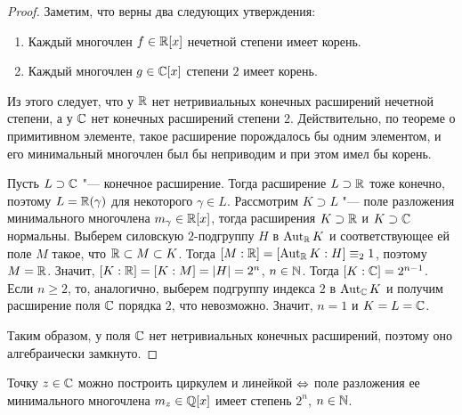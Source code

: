 \begin{proof}
	Заметим, что верны два следующих утверждения:
	\begin{enumerate}
		\item Каждый многочлен $f \in \mathbb{R}[x]$ нечетной степени имеет корень.
		\item Каждый многочлен $g \in \mathbb{C}[x]$ степени $2$ имеет корень.
	\end{enumerate}

	Из этого следует, что у $\mathbb{R}$ нет нетривиальных конечных расширений нечетной степени, а у $\mathbb{C}$ нет конечных расширений степени $2$. Действительно, по теореме о примитивном элементе, такое расширение порождалось бы одним элементом, и его минимальный многочлен был бы неприводим и при этом имел бы корень.
	
	Пусть $L \supset \mathbb{C}$ "--- конечное расширение. Тогда расширение $L \supset \mathbb{R}$ тоже конечно, поэтому $L = \mathbb{R}(\gamma)$ для некоторого $\gamma \in L$. Рассмотрим $K \supset L$ "--- поле разложения минимального многочлена $m_\gamma \in \mathbb{R}[x]$, тогда расширения $K \supset\mathbb{R}$ и $K \supset \mathbb{C}$ нормальны. Выберем силовскую $2$-подгруппу $H$ в $\operatorname{Aut}_{\mathbb{R}}K$ и соответствующее ей поле $M$ такое, что $\mathbb{R} \subset M \subset K$. Тогда $[M : \R] \hm= [\Aut_{\R}K : H] \equiv_2 1$, поэтому $M = \mathbb{R}$. Значит, $[K : \mathbb{R}] = [K : M] = |H| = 2^n$, $n \in \mathbb{N}$. Тогда $[K : \mathbb{C}] = 2^{n - 1}$. Если $n \ge 2$, то, аналогично, выберем подгруппу индекса $2$ в $\operatorname{Aut}_{\mathbb{C}}K$ и получим расширение поля $\mathbb{C}$ порядка $2$, что невозможно. Значит, $n = 1$ и $K = L = \mathbb{C}$.
	
	Таким образом, у поля $\mathbb{C}$ нет нетривиальных конечных расширений, поэтому оно алгебраически замкнуто.
\end{proof}

\begin{theorem}
	Точку $z \in \mathbb{C}$ можно построить циркулем и линейкой $\Leftrightarrow$ поле разложения ее минимального многочлена $m_{z} \in \mathbb{Q}[x]$ имеет степень $2^n$, $n \in \mathbb{N}$.
\end{theorem}

